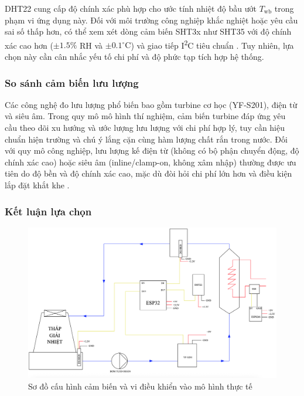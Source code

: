 \documentclass[../main.tex]{subfiles}
\begin{document}
DHT22 cung cấp độ chính xác phù hợp cho ước tính nhiệt độ bầu ướt $T_\mathrm{wb}$ trong phạm vi ứng dụng này. Đối với môi trường công nghiệp khắc nghiệt hoặc yêu cầu sai số thấp hơn, có thể xem xét dòng cảm biến SHT3x như SHT35 với độ chính xác cao hơn ($\pm 1.5\%$ RH và $\pm 0.1^\circ\mathrm{C}$) và giao tiếp I\textsuperscript{2}C tiêu chuẩn \cite{sensirion_sht3x_dis}. Tuy nhiên, lựa chọn này cần cân nhắc yếu tố chi phí và độ phức tạp tích hợp hệ thống.

\subsubsection{So sánh cảm biến lưu lượng}
\label{sec:flow_sensor_comparison}

Các công nghệ đo lưu lượng phổ biến bao gồm turbine cơ học (YF-S201), điện từ và siêu âm. Trong quy mô mô hình thí nghiệm, cảm biến turbine đáp ứng yêu cầu theo dõi xu hướng và ước lượng lưu lượng với chi phí hợp lý, tuy cần hiệu chuẩn hiện trường và chú ý lắng cặn cùng hàm lượng chất rắn trong nước. Đối với quy mô công nghiệp, lưu lượng kế điện từ (không có bộ phận chuyển động, độ chính xác cao) hoặc siêu âm (inline/clamp-on, không xâm nhập) thường được ưu tiên do độ bền và độ chính xác cao, mặc dù đòi hỏi chi phí lớn hơn và điều kiện lắp đặt khắt khe \cite{ashrae2020cooling,epa_watersense_cooling_towers_2012}.

\subsubsection{Kết luận lựa chọn}
\label{sec:selection_conclusion}

\begin{figure}
    \centering
    \includegraphics[width=1\textwidth]{Hinhve/so_do_dien.png}
    \caption{Sơ đồ cấu hình cảm biến và vi điều khiển vào mô hình thực tế}
    \label{fig:so_do_dien}
\end{figure}
\end{document}
